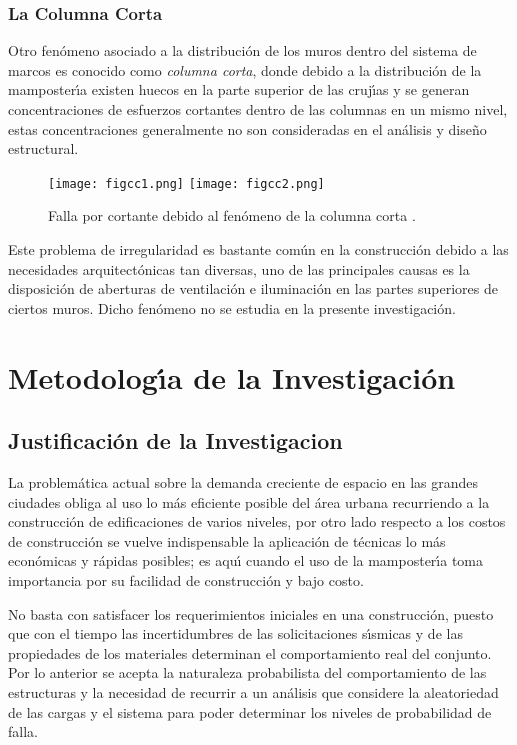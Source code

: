 \newpage

\subsubsection{La Columna Corta}
		
Otro fen\'omeno asociado a la distribuci\'on de los muros dentro del sistema de marcos es conocido como \emph{columna corta}, donde debido a la distribuci\'on de la mamposter\'{\i}a existen huecos en la parte superior de las cruj\'{\i}as y se generan concentraciones de esfuerzos cortantes dentro de las columnas en un mismo nivel, estas concentraciones generalmente  no son consideradas en el an\'alisis y dise\~no estructural. 

\begin{figure}
	\centering
		\texttt{[image: figcc1.png]}
				\texttt{[image: figcc2.png]}
	\caption{Falla por cortante debido al fen\'omeno de la columna corta \cite{WHE2011}.}
	\label{fig:figm5}
\end{figure}

Este problema de irregularidad es bastante com\'un en la construcci\'on debido a las necesidades arquitect\'onicas tan diversas, uno de las principales causas es la disposici\'on de aberturas de ventilaci\'on e iluminaci\'on en las partes superiores de ciertos muros. Dicho fen\'omeno no se estudia en la presente investigaci\'on.

\newpage

\section{Metodolog\'{\i}a de la Investigaci\'on}

	\subsection{Justificaci\'on de la Investigacion}
	
La problem\'atica actual sobre la demanda creciente de espacio en las grandes ciudades obliga al uso lo m\'as eficiente posible del \'area urbana recurriendo a la construcci\'on de edificaciones de varios niveles, por otro lado respecto a los costos de construcci\'on se vuelve indispensable la aplicaci\'on de t\'ecnicas lo m\'as econ\'omicas y r\'apidas posibles; es aqu\'{\i} cuando el uso de la mamposter\'{\i}a toma importancia por su facilidad de construcci\'on y bajo costo. 
	
No basta con satisfacer los requerimientos iniciales en una construcci\'on, puesto que con el tiempo las incertidumbres de las solicitaciones s\'{\i}smicas y de las propiedades de los materiales determinan el comportamiento real del conjunto. Por lo anterior se acepta la naturaleza probabilista del comportamiento de las estructuras y la necesidad de recurrir a un an\'alisis que considere la aleatoriedad de las cargas y el sistema para poder determinar los niveles de probabilidad de falla.

